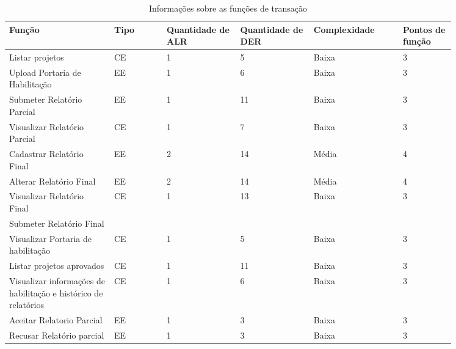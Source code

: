 	\begin{table*}[!h]
	\centering
	\caption{Informações sobre as funções de transação}
	\label{funcoes_transacao}
	  \begin{tabular}{p{0.20\linewidth}p{0.10\linewidth}p{0.14\linewidth}p{0.14\linewidth}p{0.17\linewidth}p{0.10\linewidth}}
	\hline
	\textbf{Função} & \textbf{Tipo} & \textbf{Quantidade de ALR} & \textbf{Quantidade de DER} & \textbf{Complexidade} & \textbf{Pontos de função} \\
	\hline
	Listar projetos & CE & 1 & 5 & Baixa & 3 \\
	\hline
	Upload Portaria de Habilitação & EE & 1 & 6 & Baixa & 3 \\
	\hline
	Submeter Relatório Parcial & EE & 1 & 11 & Baixa & 3 \\
	\hline
	Visualizar Relatório Parcial & CE & 1 & 7 & Baixa & 3 \\
	\hline
	Cadastrar Relatório Final & EE & 2 & 14 & Média & 4 \\
	\hline
	Alterar Relatório Final & EE & 2 & 14 & Média & 4 \\
	\hline
	Visualizar Relatório Final & CE & 1 & 13 & Baixa & 3 \\
	\hline
	Submeter Relatório Final &  &  &  &  &  \\
	\hline
	Visualizar Portaria de habilitação & CE & 1 & 5 & Baixa & 3 \\
	\hline
	Listar projetos aprovados & CE & 1 & 11 & Baixa & 3 \\
	\hline
	Visualizar informações de habilitação e histórico de relatórios & CE & 1 & 6 & Baixa & 3 \\
	\hline
	Aceitar Relatorio Parcial & EE & 1 & 3 & Baixa & 3 \\
	\hline
	Recusar Relatório parcial & EE & 1 & 3 & Baixa & 3\\
	\end{tabular}
	\end{table*}

